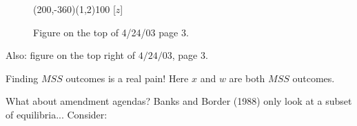 \documentclass[12pt]{article}
\newcommand{\n}{\noindent}
\newcommand{\s}{\vspace{5mm}}
\begin{document}
\begin{figure}[htb]
\begin{egame}
\putbranch(200,-360)(1,2){100}
\ib{}{}[$z$]


%
\end{egame}
\hspace*{\fill}\s\s\s\s\s\s\s\s\s\s\s\s\s
\caption[]{Figure on the top of 4/24/03 page 3.}\label{f:fifteen}
\end{figure}

\begin{center}
Also: figure on the top right of $4/24/03$, page $3$.
\end{center}

\s
\n Finding $MSS$ outcomes is a real pain!  Here $x$ and $w$ are both $MSS$ outcomes.

\s
\n  What about amendment agendas?  Banks and Border (1988) only look at a subset of equilibria... Consider:
\end{document}
